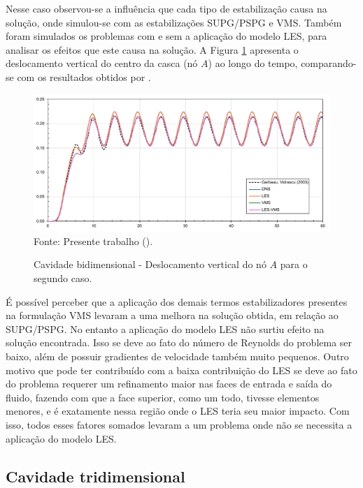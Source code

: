 Nesse caso observou-se a influência que cada tipo de estabilização causa na solução, onde simulou-se com as estabilizações SUPG/PSPG e VMS. Também foram simulados os problemas com e sem a aplicação do modelo LES, para analisar os efeitos que este causa na solução. A Figura \ref{fig:cavity2D-rescoarse} apresenta o deslocamento vertical do centro da casca (nó $A$) ao longo do tempo, comparando-se com os resultados obtidos por .

\begin{figure}[h!]
    \centering
    \caption{Cavidade bidimensional - Deslocamento vertical do nó $A$ para o segundo caso.}
    \includegraphics[width=\linewidth]{Figuras/FSI-Cavity2D/results-coarse.pdf}
    \\Fonte: Presente trabalho (\the\year).
    \label{fig:cavity2D-rescoarse}
\end{figure}

É possível perceber que a aplicação dos demais termos estabilizadores presentes na formulação VMS levaram a uma melhora na solução obtida, em relação ao SUPG/PSPG. No entanto a aplicação do modelo LES não surtiu efeito na solução encontrada. Isso se deve ao fato do número de Reynolds do problema ser baixo, além de possuir gradientes de velocidade também muito pequenos. Outro motivo que pode ter contribuído com a baixa contribuição do LES se deve ao fato do problema requerer um refinamento maior nas faces de entrada e saída do fluido, fazendo com que a face superior, como um todo, tivesse elementos menores, e é exatamente nessa região onde o LES teria seu maior impacto. Com isso, todos esses fatores somados levaram a um problema onde não se necessita a aplicação do modelo LES.

\newpage
\subsection{Cavidade tridimensional}

